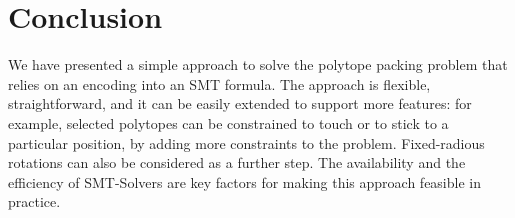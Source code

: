 \section{Conclusion}

We have presented a simple approach to solve the polytope
packing problem that relies on an encoding into an SMT
formula. The approach is flexible, straightforward, and
it can be easily extended to support more features: for
example, selected polytopes can be constrained to touch
or to stick to a particular position, by adding more
constraints to the problem. Fixed-radious rotations can 
also be considered as a further step. The availability
and the efficiency of SMT-Solvers are key factors for
making this approach feasible in practice.


